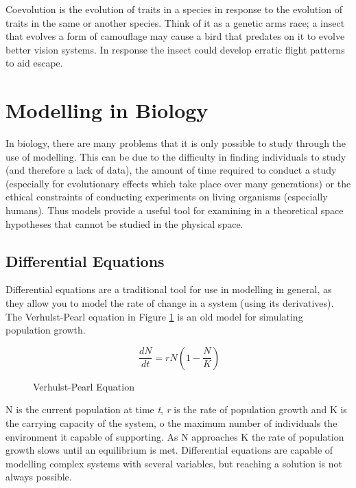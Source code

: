 \documentclass[authoryearcitations]{UoYCSproject}
\begin{document}
\begin{description}[style=nextline]
\item [Coevolution] Coevolution is the evolution of traits in a species in response to the evolution of traits in the  same or another species. Think of it as a genetic arms race; a insect that evolves a form of camouflage may cause a bird that predates on it to evolve better vision systems. In response the insect could develop erratic flight patterns to aid escape.

\end{description}


\section{Modelling in Biology}
In biology, there are many problems that it is only possible to study through the use of modelling. This can be due to the difficulty in finding individuals to study (and therefore a lack of data), the amount of time required to conduct a study (especially for evolutionary effects which take place over many generations) or the ethical constraints of conducting experiments on living organisms (especially humans). Thus models provide a useful tool for examining in a theoretical space hypotheses that cannot be studied in the physical space.

\subsection{Differential Equations}
Differential equations are a traditional tool for use in modelling in general, as they allow you to model the rate of change in a system (using its derivatives). The Verhulst-Pearl equation \cite{garnier1838correspondance, pearl1920rate} in Figure \ref{fig:verhulstPearl} is an old model for simulating population growth. 

\begin{figure}[h]
$$\ \frac{dN}{dt} = rN(1-\frac{N}{K}) $$
\caption{Verhulst-Pearl Equation}
\label{fig:verhulstPearl}
\end{figure}

N is the current population at time \textit{t}, \textit{r} is the rate of population growth and K is the carrying capacity of the system, o the maximum number of individuals the environment it capable of supporting. As N approaches K the rate of population growth slows until an equilibrium is met. Differential equations are capable of modelling complex systems with several variables, but reaching a solution is not always possible. 
\end{document}
